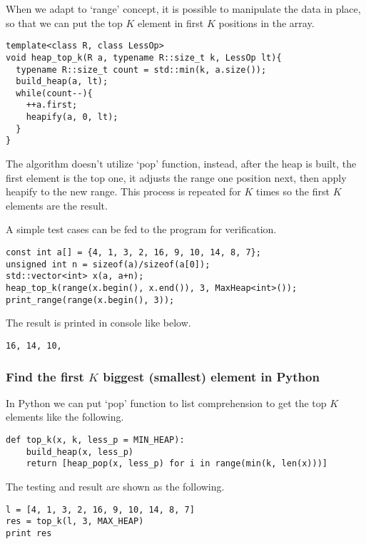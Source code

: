 \documentclass{article}
\begin{document}
When we adapt to `range' concept, it is possible to manipulate
the data in place, so that we can put the top $K$ element
in first $K$ positions in the array.

\begin{lstlisting}
template<class R, class LessOp>
void heap_top_k(R a, typename R::size_t k, LessOp lt){
  typename R::size_t count = std::min(k, a.size());
  build_heap(a, lt);
  while(count--){
    ++a.first;
    heapify(a, 0, lt);
  }
}
\end{lstlisting}

The algorithm doesn't utilize `pop' function, instead, after
the heap is built, the first element is the top one, it 
adjusts the range one position next, then apply heapify
to the new range. This process is repeated for $K$ times
so the first $K$ elements are the result.

A simple test cases can be fed to the program for verification.

\begin{lstlisting}
const int a[] = {4, 1, 3, 2, 16, 9, 10, 14, 8, 7};
unsigned int n = sizeof(a)/sizeof(a[0]);
std::vector<int> x(a, a+n);
heap_top_k(range(x.begin(), x.end()), 3, MaxHeap<int>());
print_range(range(x.begin(), 3));
\end{lstlisting}

The result is printed in console like below.

\begin{verbatim}
16, 14, 10,
\end{verbatim}

\subsubsection*{Find the first $K$ biggest (smallest) element in Python}

In Python we can put `pop' function to list comprehension to
get the top $K$ elements like the following.

\lstset{language=Python}
\begin{lstlisting}
def top_k(x, k, less_p = MIN_HEAP):
    build_heap(x, less_p)
    return [heap_pop(x, less_p) for i in range(min(k, len(x)))]
\end{lstlisting}

The testing and result are shown as the following.

\begin{lstlisting}
l = [4, 1, 3, 2, 16, 9, 10, 14, 8, 7] 
res = top_k(l, 3, MAX_HEAP)
print res
\end{lstlisting}
\end{document}

